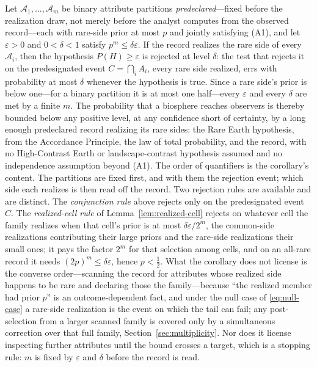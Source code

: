 \begin{corollary}
\label{cor:rareearth}
Let $\mathcal{A}_1, \ldots, \mathcal{A}_m$ be binary attribute partitions \emph{predeclared}---fixed before the realization draw, not merely before the analyst computes from the observed record---each with rare-side prior at most $p$ and jointly satisfying {\rm (A1)}, and let $\varepsilon > 0$ and $0 < \delta < 1$ satisfy $p^m \le \delta\varepsilon$. If the record realizes the rare side of every $\mathcal{A}_i$, then the hypothesis $P(H) \ge \varepsilon$ is rejected at level $\delta$: the test that rejects it on the predesignated event $C = \bigcap_i A_i$, every rare side realized, errs with probability at most $\delta$ whenever the hypothesis is true. Since a rare side's prior is below one---for a binary partition it is at most one half---every $\varepsilon$ and every $\delta$ are met by a finite $m$. The probability that a biosphere reaches observers is thereby bounded below any positive level, at any confidence short of certainty, by a long enough predeclared record realizing its rare sides: the Rare Earth hypothesis, from the Accordance Principle, the law of total probability, and the record, with no High-Contrast Earth or landscape-contrast hypothesis assumed and no independence assumption beyond {\rm (A1)}. The order of quantifiers is the corollary's content. The partitions are fixed first, and with them the rejection event; which side each realizes is then read off the record. Two rejection rules are available and are distinct. The \emph{conjunction rule} above rejects only on the predesignated event $C$. The \emph{realized-cell rule} of Lemma~\ref{lem:realized-cell} rejects on whatever cell the family realizes when that cell's prior is at most $\delta\varepsilon/2^m$, the common-side realizations contributing their large priors and the rare-side realizations their small ones; it pays the factor $2^m$ for that selection among cells, and on an all-rare record it needs $(2p)^m \le \delta\varepsilon$, hence $p < \tfrac12$. What the corollary does not license is the converse order---scanning the record for attributes whose realized side happens to be rare and declaring those the family---because ``the realized member had prior $p$'' is an outcome-dependent fact, and under the null case of \eqref{eq:null-case} a rare-side realization is the event on which the tail can fail; any post-selection from a larger scanned family is covered only by a simultaneous correction over that full family, Section~\ref{sec:multiplicity}. Nor does it license inspecting further attributes until the bound crosses a target, which is a stopping rule: $m$ is fixed by $\varepsilon$ and $\delta$ before the record is read.
\end{corollary}

